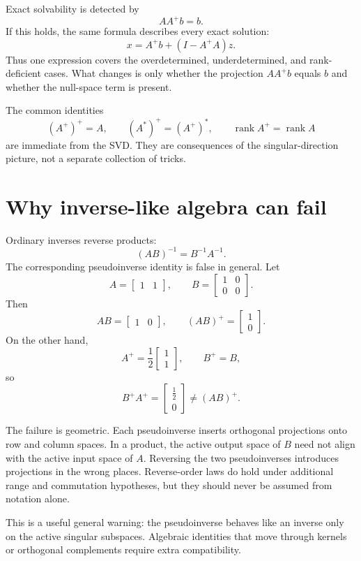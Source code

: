 Exact solvability is detected by
\[
  AA^+b=b.
\]
If this holds, the same formula describes every exact solution:
\[
  x=A^+b+(I-A^+A)z.
\]
Thus one expression covers the overdetermined, underdetermined, and rank-deficient cases.  What changes is only whether the projection \(AA^+b\) equals \(b\) and whether the null-space term is present.

The common identities
\[
  (A^+)^+=A,
  \qquad
  (A^*)^+=(A^+)^*,
  \qquad
  \operatorname{rank}A^+=\operatorname{rank}A
\]
are immediate from the SVD.  They are consequences of the singular-direction picture, not a separate collection of tricks.

\section{Why inverse-like algebra can fail}

Ordinary inverses reverse products:
\[
  (AB)^{-1}=B^{-1}A^{-1}.
\]
The corresponding pseudoinverse identity is false in general.  Let
\[
  A=
  \begin{bmatrix}1&1\end{bmatrix},
  \qquad
  B=
  \begin{bmatrix}
    1&0\\
    0&0
  \end{bmatrix}.
\]
Then
\[
  AB=\begin{bmatrix}1&0\end{bmatrix},
  \qquad
  (AB)^+=
  \begin{bmatrix}1\\0\end{bmatrix}.
\]
On the other hand,
\[
  A^+=\frac12
  \begin{bmatrix}1\\1\end{bmatrix},
  \qquad
  B^+=B,
\]
so
\[
  B^+A^+=
  \begin{bmatrix}\frac12\\0\end{bmatrix}
  \ne
  (AB)^+.
\]

The failure is geometric.  Each pseudoinverse inserts orthogonal projections onto row and column spaces.  In a product, the active output space of \(B\) need not align with the active input space of \(A\).  Reversing the two pseudoinverses introduces projections in the wrong places.  Reverse-order laws do hold under additional range and commutation hypotheses, but they should never be assumed from notation alone.

This is a useful general warning: the pseudoinverse behaves like an inverse only on the active singular subspaces.  Algebraic identities that move through kernels or orthogonal complements require extra compatibility.

